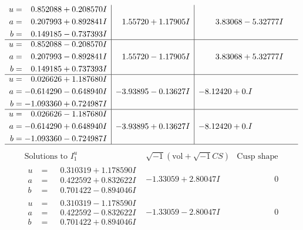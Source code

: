 \documentclass[1p]{elsarticle_modified}
\theoremstyle{definition}
\newcommand{\I}{\sqrt{-1}}
\begin{document}
$$\begin{array}{c|c|c}
\begin{aligned}
u &= \phantom{-}0.852088 + 0.208570 I \\
a &= \phantom{-}0.207993 + 0.892841 I \\
b &= \phantom{-}0.149185 - 0.737393 I\end{aligned}
 & \phantom{-}1.55720 + 1.17905 I & \phantom{-}3.83068 - 5.32777 I \\ \hline\begin{aligned}
u &= \phantom{-}0.852088 - 0.208570 I \\
a &= \phantom{-}0.207993 - 0.892841 I \\
b &= \phantom{-}0.149185 + 0.737393 I\end{aligned}
 & \phantom{-}1.55720 - 1.17905 I & \phantom{-}3.83068 + 5.32777 I \\ \hline\begin{aligned}
u &= \phantom{-}0.026626 + 1.187680 I \\
a &= -0.614290 - 0.648940 I \\
b &= -1.093360 + 0.724987 I\end{aligned}
 & -3.93895 - 0.13627 I & -8.12420 + 0. I\phantom{ +0.000000I} \\ \hline\begin{aligned}
u &= \phantom{-}0.026626 - 1.187680 I \\
a &= -0.614290 + 0.648940 I \\
b &= -1.093360 - 0.724987 I\end{aligned}
 & -3.93895 + 0.13627 I & -8.12420 + 0. I\phantom{ +0.000000I}\\
 \hline 
 \end{array}$$\newpage$$\begin{array}{c|c|c}  
\text{Solutions to }I^u_{1}& \I (\text{vol} + \sqrt{-1}CS) & \text{Cusp shape}\\
 \hline 
\begin{aligned}
u &= \phantom{-}0.310319 + 1.178590 I \\
a &= \phantom{-}0.422592 + 0.832622 I \\
b &= \phantom{-}0.701422 - 0.894046 I\end{aligned}
 & -1.33059 + 2.80047 I & \phantom{-0.000000 } 0 \\ \hline\begin{aligned}
u &= \phantom{-}0.310319 - 1.178590 I \\
a &= \phantom{-}0.422592 - 0.832622 I \\
b &= \phantom{-}0.701422 + 0.894046 I\end{aligned}
 & -1.33059 - 2.80047 I & \phantom{-0.000000 } 0 \\ \hline\begin{aligned}

\end{aligned}
\end{array}$$
\end{document}
